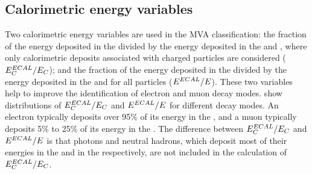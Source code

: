\subsection{Calorimetric energy variables}

Two calorimetric energy variables are used in the MVA classification: the fraction of the energy  deposited in the \ECAL divided by the  energy deposited in the \ECAL and \HCAL, where only calorimetric deposits associated with charged particles are considered ($E^{ECAL}_{C} / E_{C}$); and the fraction of the energy  deposited in the \ECAL divided by the  energy deposited in the \ECAL and \HCAL for all particles ($E^{ECAL} / E$). These  two variables help to improve the identification of electron and muon decay modes.  show distributions of  $E^{ECAL}_{C} / E_{C}$ and $E^{ECAL} / E$ for different decay modes. An electron typically deposits over 95\% of its energy in the \ECAL, and a muon typically deposits 5\% to 25\% of its energy in the \ECAL. The difference between $E^{ECAL}_{C} / E_{C}$ and  $E^{ECAL} / E$ is that photons and neutral hadrons, which deposit most of their energies in the \ECAL and in the \HCAL respectively, are not included in the calculation of $E^{ECAL}_{C} / E_{C}$.



